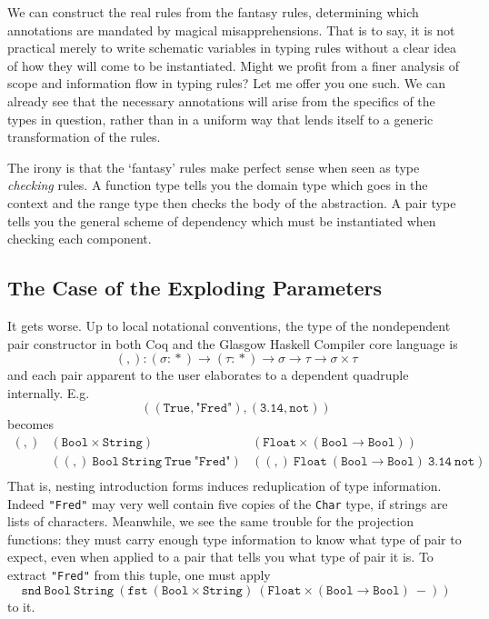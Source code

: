 \documentclass[format=acmsmall, screen, review, anonymous, timestamp]{acmart}
\begin{document}
We can construct the real rules from the fantasy rules, determining
which annotations are mandated by magical misapprehensions. That is to
say, it is not practical merely to write schematic variables in typing rules
without a clear idea of how they will come to be instantiated. Might
we profit from a finer analysis of scope and information flow in
typing rules? Let me offer you one such. We can already see that the
necessary annotations will arise from the specifics of the types in
question, rather than in a uniform way that lends itself
to a generic transformation of the rules.

The irony is that the `fantasy' rules make perfect sense when seen as
type \emph{checking} rules. A function type tells you the domain type
which goes in the context and the range type then checks the body of
the abstraction. A pair type tells you the general scheme of dependency
which must be instantiated when checking each component.


\subsection{The Case of the Exploding Parameters}

It gets worse. Up to local notational conventions, the type of the
nondependent pair constructor in both Coq and the Glasgow Haskell
Compiler core language is
\[
  (,) : (\sigma\!:\!\ast)\to (\tau\!:\!\ast)\to \sigma\to\tau\to\sigma\times\tau
\]
and each pair apparent to the user elaborates to a dependent quadruple
internally. E.g.
\[
  ((\texttt{True},\texttt{"Fred"}),(\texttt{3.14},\texttt{not}))
\]
becomes
\[\begin{array}{cll}
    (,) & (\texttt{Bool}\times\texttt{String})& (\texttt{Float}\times(\texttt{Bool}\to\texttt{Bool}))\\
        & ((,)\:\texttt{Bool}\:\texttt{String}\:\texttt{True}\:\texttt{"Fred"})
        & ((,)\:\texttt{Float}\:(\texttt{Bool}\to\texttt{Bool})\:\texttt{3.14}\:\texttt{not})\\
  \end{array}\]
That is, nesting introduction forms induces reduplication of type
information. Indeed \texttt{"Fred"} may very well contain five copies
of the \texttt{Char} type, if strings are lists of
characters. Meanwhile, we see the same trouble for the projection functions: they
must carry enough type information to know what type of pair to
expect, even when applied to a pair that tells you what type of pair
it is. To extract \texttt{"Fred"} from this tuple, one must apply
\[
  \texttt{snd}\:\texttt{Bool}\:\texttt{String}\:(\texttt{fst}\: (\texttt{Bool}\times\texttt{String})\: (\texttt{Float}\times(\texttt{Bool}\to\texttt{Bool})\:-))
\]
to it.
\end{document}
